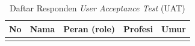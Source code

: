 \begin{longtable}{|c|p{3.5cm}|p{3.5cm}|p{3.5cm}|c|}
    \caption{Daftar Responden \textit{User Acceptance Test} (UAT)}
    \label{tabel:daftar_responden_uat}
    \\
    \hline
    \textbf{No} & \textbf{Nama}               & \textbf{Peran (role)}                                  & \textbf{Profesi}     & \textbf{Umur} \\
    \hline
    \endfirsthead



    \hline
    \endlastfoot


\end{longtable}
